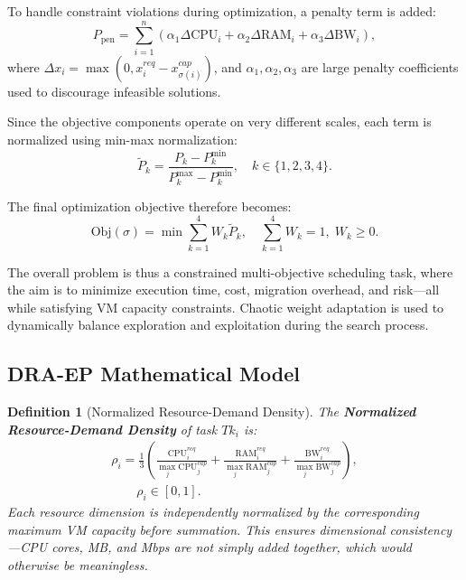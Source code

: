 \documentclass[journal]{IEEEtran}
\newtheorem{definition}{Definition}
\begin{document}
To handle constraint violations during optimization, a penalty term is added:
\begin{equation}
P_{\mathrm{pen}} =
\sum_{i=1}^{n}
\left(
\alpha_1 \Delta \mathrm{CPU}_i +
\alpha_2 \Delta \mathrm{RAM}_i +
\alpha_3 \Delta \mathrm{BW}_i
\right),
\end{equation}
where $\Delta x_i = \max(0, x^{req}_i - x^{cap}_{\sigma(i)})$, and $\alpha_1,\alpha_2,\alpha_3$ are large penalty coefficients used to discourage infeasible solutions.

Since the objective components operate on very different scales, each term is normalized using min-max normalization:
\begin{equation}
\tilde{P}_k =
\frac{P_k - P_k^{\min}}{P_k^{\max} - P_k^{\min}}, \quad k \in \{1,2,3,4\}.
\end{equation}

The final optimization objective therefore becomes:
\begin{equation}
\mathrm{Obj}(\sigma)=\min \sum_{k=1}^{4} W_k \tilde{P}_k,
\quad \sum_{k=1}^{4} W_k = 1,\; W_k \ge 0.
\end{equation}

The overall problem is thus a constrained multi-objective scheduling task, where the aim is to minimize execution time, cost, migration overhead, and risk---all while satisfying VM capacity constraints. Chaotic weight adaptation is used to dynamically balance exploration and exploitation during the search process.

\subsection{DRA-EP Mathematical Model}
\label{sec:math}

\begin{definition}[Normalized Resource-Demand Density]
\label{def:rho}
The \textbf{Normalized Resource-Demand Density} of task $Tk_i$ is:
\begin{equation*}
\begin{multlined}
    \rho_i = \frac{1}{3}\!\left(
        \frac{\mathrm{CPU}^{req}_i}{\max_j\mathrm{CPU}^{cap}_j} +
        \frac{\mathrm{RAM}^{req}_i}{\max_j\mathrm{RAM}^{cap}_j} +
        \frac{\mathrm{BW}^{req}_i}{\max_j\mathrm{BW}^{cap}_j}
    \right), \\
    \qquad \rho_i \in [0,1].
\end{multlined}
\label{eq:rho}
\end{equation*}
Each resource dimension is independently normalized by the corresponding maximum VM capacity before summation. This ensures dimensional consistency---CPU cores, MB, and Mbps are not simply added together, which would otherwise be meaningless.
\end{definition}
\end{document}
